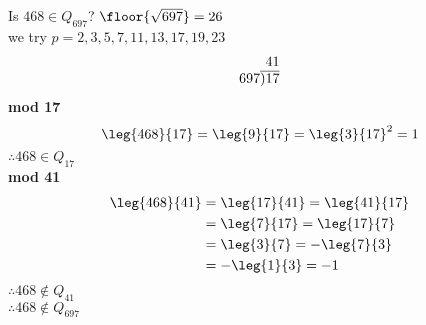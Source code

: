 Is $468\in Q_{697}$?
\soln %
$\floor{\sqrt{697}}=26$ \\
we try $p=2,3,5,7,11,13,17,19,23$
\[
\begin{array}[t]{@{}c@{}c@{}c@{}c@{}c@{}c@{}}
&&&&4&1\\\cline{4-6}
6&9&7&)&1&7\\
\end{array}
\]
\textbf{mod 17} %
\[ \leg{468}{17} = \leg{9}{17} = \leg{3}{17}^2 = 1 \]
$\therefore468\in Q_{17}$ \\
\textbf{mod 41}
\begin{align*}
\leg{468}{41} &= \leg{17}{41} = \leg{41}{17} \\
&= \leg{7}{17} = \leg{17}{7} \\
&= \leg{3}{7} = -\leg{7}{3} \\
&= -\leg{1}{3} = -1
\end{align*}
$\therefore468\notin Q_{41}$ \\
$\therefore468\notin Q_{697}$

